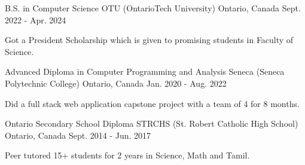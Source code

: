 

\begin{cventries}

  \cventry
    {B.S. in Computer Science} %
    {OTU (OntarioTech University)} %
    {Ontario, Canada} %
    {Sept. 2022 - Apr. 2024} %
    {
      \begin{cvitems} %
        \item {Got a President Scholarship which is given to promising students in Faculty of Science.}
      \end{cvitems}
    }

  \cventry
  {Advanced Diploma in Computer Programming and Analysis} %
  {Seneca (Seneca Polytechnic College)} %
  {Ontario, Canada} %
  {Jan. 2020 - Aug. 2022} %
  {
    \begin{cvitems} %
      \item {Did a full stack web application capstone project with a team of 4 for 8 months.}
    \end{cvitems}
  }

  \cventry
    {Ontario Secondary School Diploma} %
    {STRCHS (St. Robert Catholic High School)} %
    {Ontario, Canada} %
    {Sept. 2014 - Jun. 2017} %
    {
      \begin{cvitems} %
        \item {Peer tutored 15+ students for 2 years in Science, Math and Tamil.}
      \end{cvitems}
    }
\end{cventries}


